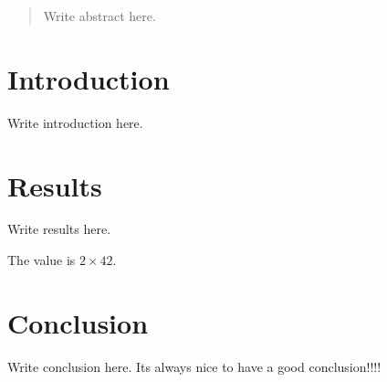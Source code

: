 \documentclass{article}
\begin{document}
\begin{abstract}
Write abstract here.
\end{abstract}

\section{Introduction}

Write introduction here.

\section{Results}

Write results here.

The value is $2 \times 42$.

\section{Conclusion}

Write conclusion here.
Its always nice to have a good conclusion!!!!
\end{document}
